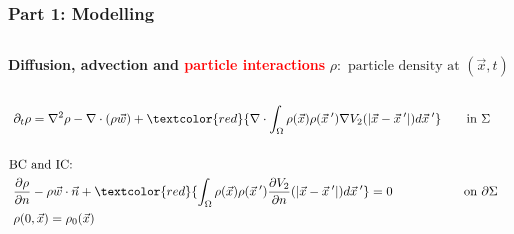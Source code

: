 \documentclass[aspectratio=169,xcolor=dvipsnames]{beamer}
\begin{document}
\begin{frame}
	\frametitle{Part 1: Modelling}
	\begin{columns}
		\textbf{Diffusion, advection and \textcolor{red}{particle interactions}}
		$	\rho: \text{ particle density at } (\vec{x},t)$
		\begin{align*}
		\\
		\partial_t \rho &= \nabla^2 \rho - \nabla \cdot (\rho \vec{w}) +\textcolor{red}{ \nabla \cdot \int_\Omega \rho(\vec{x}) \rho(\vec{x}\hspace{0.2em}') \nabla V_2(|\vec{x}-\vec{x}\hspace{0.2em}'|)d\vec{x}\hspace{0.2em}'} \qquad\text{in    } \Sigma\\
		\\
		\text{BC }& \text{and IC:}\\
		\frac{\partial \rho}{\partial n}& - \rho \vec{w} \cdot \vec{n} +\textcolor{red}{ \int_\Omega \rho(\vec{x}) \rho(\vec{x}\hspace{0.2em}')  \frac{ \partial  V_2}{\partial n}(|\vec{x}-\vec{x}\hspace{0.2em}'|)d\vec{x}\hspace{0.2em}'} = 0 \quad\ \ \qquad \qquad\text{on   } \partial \Sigma   \\
		\rho(0&,\vec{x}) = \rho_0(\vec{x}) 
		\end{align*}
		\vspace{-1cm}
		\begin{figure}
			\includegraphics[width=3cm]{bloodcells.jpg}\\
			\includegraphics[width=3cm]{bacteria.png}\\
			\includegraphics[width=3cm]{Microfilter.png}\\
			\includegraphics[width=3cm]{beer.png}
		\end{figure}
	\end{columns}
\end{frame}
\end{document}
